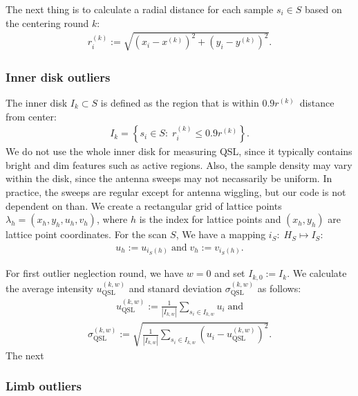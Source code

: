 \documentclass{aa}
\newcommand{\eqnl}[2]{\begin{eqnarray}\label{#1}#2\end{eqnarray}}
\newcommand{\s}[2]{{#1}_{\mathrm{#2}}}
\begin{document}
  The next thing is to calculate a radial distance for each sample $s_i \in S$ based on the centering round $k$:
  \eqnl{calib_radial_distance}{
  r_i^{(k)} := \sqrt{\left( x_i - x^{(k)} \right)^2 + \left( y_i - y^{(k)} \right)^2} \text{.}
  }

  \subsubsection{Inner disk outliers} \label{sect:outliers_disk}

  The inner disk $I_k \subset S$ is defined as the region that is within $0.9 r^{(k)}$ distance from center:
  \eqnl{calib_inner_disk1}{
  I_k = \left\{ s_i \in S :\; r_i^{(k)} \le 0.9 r^{(k)} \right\} \text{.}
  }
  We do not use the whole inner disk for measuring QSL, since it typically contains bright and dim features such as active regions. Also, the sample density may vary within the disk, since the antenna sweeps may not necassarily be uniform. In practice, the sweeps are regular except for antenna wiggling, but our code is not dependent on than. We create a rectangular grid of lattice points $\lambda_{h} = \left( x_h, y_h, u_h, v_h \right)$, where $h$ is the index for lattice points and $\left( x_h, y_h \right)$ are lattice point coordinates. For the scan $S$, We have a mapping $i_S:\;H_S \mapsto I_S$: 
  \eqnl{calib_inner_disk_lattice}{
  u_h := u_{i_S(h)} \; \text{and} \; v_h := v_{i_S(h)} \text{.}
  }
  
  For first outlier neglection round, we have $w=0$ and set $I_{k,0} := I_k$. We calculate the average intensity $\s{u}{QSL}^{(k,w)}$ and stanard deviation $\s{\sigma}{QSL}^{(k,w)}$ as follows:
  \eqnl{calib_inner_disk2}{
  \s{u}{QSL}^{(k,w)} := \frac{1}{|I_{k,w}|} \sum \limits_{s_i \in I_{k,w}} u_i \; \text{and}
  }
  \eqnl{calib_inner_disk3}{
  \s{\sigma}{QSL}^{(k,w)} := \sqrt{\frac{1}{|I_{k,w}|} \sum \limits_{s_i \in I_{k,w}} \left( u_i - \s{u}{QSL}^{(k,w)} \right)^2} \text{.}
  }
  The next 

  \subsubsection{Limb outliers} \label{sect:outliers_limb}
\end{document}
